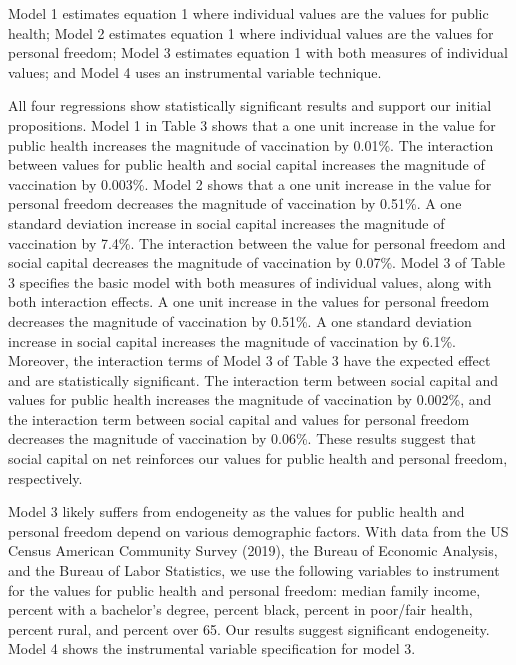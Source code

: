 \documentclass[
]{article}
\begin{document}
Model 1 estimates equation 1 where individual values are the values for
public health; Model 2 estimates equation 1 where individual values are
the values for personal freedom; Model 3 estimates equation 1 with both
measures of individual values; and Model 4 uses an instrumental variable
technique.

All four regressions show statistically significant results and support
our initial propositions. Model 1 in Table 3 shows that a one unit
increase in the value for public health increases the magnitude of
vaccination by 0.01\%. The interaction between values for public health
and social capital increases the magnitude of vaccination by 0.003\%.
Model 2 shows that a one unit increase in the value for personal freedom
decreases the magnitude of vaccination by 0.51\%. A one standard
deviation increase in social capital increases the magnitude of
vaccination by 7.4\%. The interaction between the value for personal
freedom and social capital decreases the magnitude of vaccination by
0.07\%. Model 3 of Table 3 specifies the basic model with both measures
of individual values, along with both interaction effects. A one unit
increase in the values for personal freedom decreases the magnitude of
vaccination by 0.51\%. A one standard deviation increase in social
capital increases the magnitude of vaccination by 6.1\%. Moreover, the
interaction terms of Model 3 of Table 3 have the expected effect and are
statistically significant. The interaction term between social capital
and values for public health increases the magnitude of vaccination by
0.002\%, and the interaction term between social capital and values for
personal freedom decreases the magnitude of vaccination by 0.06\%. These
results suggest that social capital on net reinforces our values for
public health and personal freedom, respectively.

Model 3 likely suffers from endogeneity as the values for public health
and personal freedom depend on various demographic factors. With data
from the US Census American Community Survey (2019), the Bureau of
Economic Analysis, and the Bureau of Labor Statistics, we use the
following variables to instrument for the values for public health and
personal freedom: median family income, percent with a bachelor's
degree, percent black, percent in poor/fair health, percent rural, and
percent over 65. Our results suggest significant endogeneity. Model 4
shows the instrumental variable specification for model 3.
\end{document}
